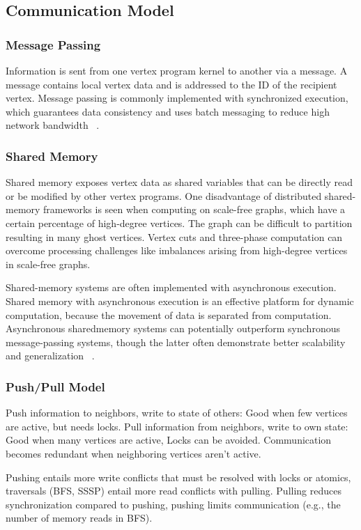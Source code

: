 \documentclass[UTF8,12pt,a4paper]{article}
\begin{document}
\subsection{Communication Model}
\subsubsection{Message Passing}
Information is sent from one vertex program kernel to another via a message.
A message contains local vertex data and is addressed to the ID of the recipient vertex.
Message passing is commonly implemented with synchronized execution,
which guarantees data consistency and uses batch messaging to reduce high network bandwidth
~\cite{DBLP:journals/csur/McCuneWM15}.
\subsubsection{Shared Memory}
Shared memory exposes vertex data as shared variables
that can be directly read or be modified by other vertex programs.
One disadvantage of distributed shared-memory frameworks is seen
when computing on scale-free graphs, which have a certain percentage of high-degree vertices.
The graph can be difficult to partition resulting in many ghost vertices.
Vertex cuts and three-phase computation can overcome processing challenges
like imbalances arising from high-degree vertices in scale-free graphs.

Shared-memory systems are often implemented with asynchronous execution.
Shared memory with asynchronous execution is an effective platform for dynamic computation,
because the movement of data is separated from computation.
Asynchronous sharedmemory systems can potentially outperform
synchronous message-passing systems,
though the latter often demonstrate better scalability and generalization
~\cite{DBLP:journals/csur/McCuneWM15}.
\subsubsection{Push/Pull Model}
Push information to neighbors, write to state of others:
Good when few vertices are active, but needs locks.
Pull information from neighbors, write to own state:
Good when many vertices are active, Locks can be avoided.
Communication becomes redundant when neighboring vertices aren't active.

Pushing entails more write conflicts that must be resolved with locks or atomics,
traversals (BFS, SSSP) entail more read conflicts with pulling.
Pulling reduces synchronization compared to pushing,
pushing limits communication (e.g., the number of memory reads in BFS).
~\cite{DBLP:conf/hpdc/BestaPGSH17}
\end{document}
